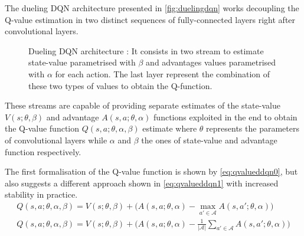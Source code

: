 The dueling DQN architecture \cite{wang2015dueling} presented in \vref{fig:duelingdqn} works decoupling the Q-value estimation in two distinct sequences of fully-connected layers right after convolutional layers.
\begin{figure}
	\centering
	\caption[Dueling DQN]{ Dueling DQN architecture \cite{wang2015dueling}: It consists in two stream to estimate state-value parametrised with $\beta$ and advantages values parametrised with $\alpha$ for each action. The last layer represent the combination of these two types of values to obtain the Q-function. \cite{franccois2018introduction}}
	\label{fig:duelingdqn}
\end{figure}

These streams are capable of providing separate estimates of the state-value  $V(s; \theta, \beta)$ and advantage $A(s,a; \theta, \alpha)$ functions exploited in the end to obtain the Q-value function $Q(s,a; \theta, \alpha, \beta)$ estimate where $\theta$ represents the parameters of convolutional layers while $\alpha$ and $\beta$ the ones of state-value and advantage function respectively.

The first formalisation of the Q-value function is shown by \vref{eq:qvalueddqn0}, but \cite{wang2015dueling} also suggests a different approach shown in \vref{eq:qvalueddqn1} with increased stability in practice.
\begin{gather}
	Q(s,a; \theta, \alpha, \beta) = V(s;\theta, \beta) + \big(A(s,a;\theta, \alpha) - \max_{a' \in \mathcal{A}}A(s, a'; \theta, \alpha)\big) \label{eq:qvalueddqn0}\\
	Q(s,a; \theta, \alpha, \beta) = V(s;\theta, \beta) + \big(A(s,a;\theta, \alpha) - \frac{1}{|\mathcal{A}|}\sum_{a' \in \mathcal{A}}A(s, a'; \theta, \alpha)\big) \label{eq:qvalueddqn1}
\end{gather}



